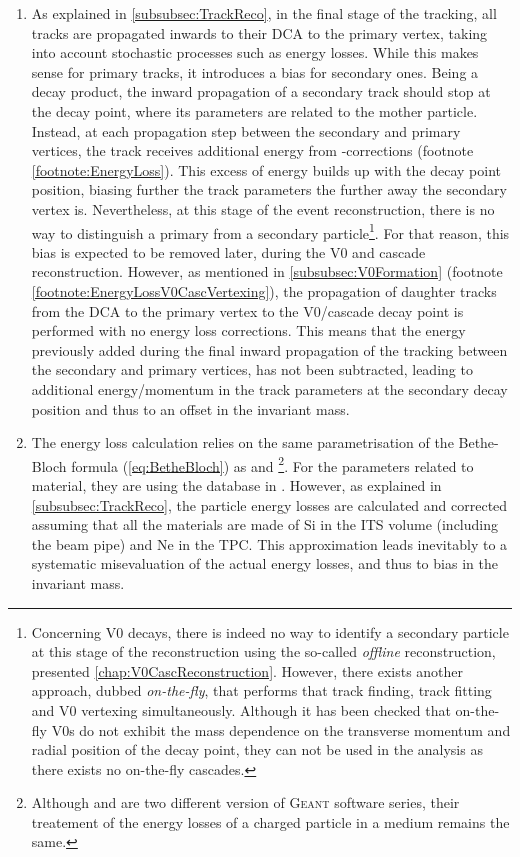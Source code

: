 \begin{enumerate}
\item As explained in \Sec\ref{subsubsec:TrackReco}, in the final stage of the tracking, all tracks are propagated inwards to their DCA to the primary vertex, taking into account stochastic processes such as energy losses. While this makes sense for primary tracks, it introduces a bias for secondary ones. Being a decay product, the inward propagation of a secondary track should stop at the decay point, where its parameters are related to the mother particle. Instead, at each propagation step between the secondary and primary vertices, the track receives additional energy from \dEdx-corrections (footnote \ref{footnote:EnergyLoss}). This excess of energy builds up with the decay point position, biasing further the track parameters the further away the secondary vertex is. Nevertheless, at this stage of the event reconstruction, there is no way to distinguish a primary from a secondary particle\footnote{Concerning V0 decays, there is indeed no way to identify a secondary particle at this stage of the reconstruction using the so-called \textit{offline} reconstruction, presented \chap\ref{chap:V0CascReconstruction}. However, there exists another approach, dubbed \textit{on-the-fly}, that performs that track finding, track fitting and V0 vertexing simultaneously. Although it has been checked that on-the-fly V0s do not exhibit the mass dependence on the transverse momentum and radial position of the decay point, they can not be used in the analysis as there exists no on-the-fly cascades.}. For that reason, this bias is expected to be removed later, during the V0 and cascade reconstruction. However, as mentioned in \Sec\ref{subsubsec:V0Formation} (footnote \ref{footnote:EnergyLossV0CascVertexing}), the propagation of daughter tracks from the DCA to the primary vertex to the V0/cascade decay point is performed with no energy loss corrections. This means that the energy previously added during the final inward propagation of the tracking between the secondary and primary vertices, has not been subtracted, leading to additional energy/momentum in the track parameters at the
secondary decay position and thus to an offset in the invariant mass.

\item The energy loss calculation relies on the same parametrisation of the Bethe-Bloch formula (\eq\ref{eq:BetheBloch}) as \GeantThree and \GeantFour\footnote{Although \GeantThree and \GeantFour are two different version of \textsc{Geant} software series, their treatement of the energy losses of a charged particle in a medium remains the same.}. For the parameters related to material, they are using the database in \cite{geant4Geant4MaterialDatabase}. However, as explained in \Sec\ref{subsubsec:TrackReco}, the particle energy losses are calculated and corrected assuming that all the materials are made of Si in the ITS volume (including the beam pipe) and Ne in the TPC. This approximation leads inevitably to a systematic misevaluation of the actual energy losses, and thus to bias in the invariant mass.


\end{enumerate}
